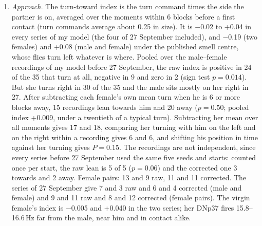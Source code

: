 \begin{enumerate}[leftmargin=*, label=\arabic*., itemsep=4pt]
\item \emph{Approach.} The turn-toward index is the turn command times the side the partner is on, averaged over the moments within 6 blocks before a first contact (turn commands average about 0.25 in size). It is $-$0.02 to +0.04 in every series of my model (the four of 27 September included), and $-$0.19 (two females) and +0.08 (male and female) under the published smell centre, whose flies turn left whatever is where. Pooled over the male--female recordings of my model before 27 September, the raw index is positive in 24 of the 35 that turn at all, negative in 9 and zero in 2 (sign test $p=0.014$). But she turns right in 30 of the 35 and the male sits mostly on her right in 27. After subtracting each female's own mean turn when he is 6 or more blocks away, 15 recordings lean towards him and 20 away ($p=0.50$; pooled index +0.009, under a twentieth of a typical turn). Subtracting her mean over all moments gives 17 and 18, comparing her turning with him on the left and on the right within a recording gives 6 and 6, and shifting his position in time against her turning gives $P=0.15$. The recordings are not independent, since every series before 27 September used the same five seeds and starts: counted once per start, the raw lean is 5 of 5 ($p=0.06$) and the corrected one 3 towards and 2 away. Female pairs: 13 and 9 raw, 11 and 11 corrected. The series of 27 September give 7 and 3 raw and 6 and 4 corrected (male and female) and 9 and 11 raw and 8 and 12 corrected (female pairs). The virgin female's index is $-$0.005 and +0.040 in the two series; her DNp37 fires 15.8--16.6\,Hz far from the male, near him and in contact alike.


\end{enumerate}
